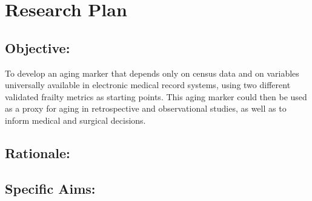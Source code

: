 \section{Research Plan }\label{research-plan}


\subsection{Objective:}\label{objective}
  


To develop an aging marker\cite{Orkaby_2017} that depends only on census data and on
variables universally available in electronic medical record systems,
using two different validated frailty metrics as starting points. This
aging marker could then be used as a proxy for aging in retrospective
and observational studies, as well as to inform medical and surgical
decisions.


\subsection{Rationale:}\label{rationale}

\subsection{Specific Aims:}\label{specific-aims}

